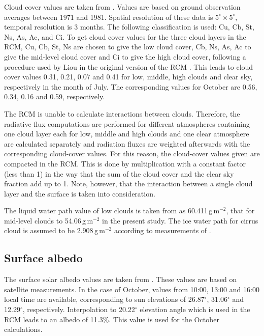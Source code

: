 \documentclass[agp]{svjour}
\begin{document}
\begin{appendix}
Cloud cover values are taken from \citet{Wa88}. Values are based on
ground observation averages between 1971 and 1981. Spatial resolution of
these data is $5^{\circ} \times 5^{\circ}$, temporal resolution is 3
months. The following classification is used: Cu, Cb, St, Ns, As, Ac,
and Ci. To get cloud cover values for the three cloud layers in the RCM,
Cu, Cb, St, Ns are chosen to give the low cloud cover, Cb, Ns, As, Ac to
give the mid-level cloud cover and Ci to give the high cloud cover,
following a procedure used by Liou in the original version of the RCM
\citep{Li85}. This leads to cloud cover values 0.31, 0.21, 0.07 and 0.41
for low, middle, high clouds and clear sky, respectively in the month of
July. The corresponding values for October are 0.56, 0.34, 0.16 and
0.59, respectively.

The RCM is unable to calculate interactions between clouds. Therefore,
the radiative flux computations are performed for different atmospheres
containing one cloud layer each for low, middle and high clouds and one
clear atmosphere are calculated separately and radiation fluxes are
weighted afterwards with the corresponding cloud-cover values. For this
reason, the cloud-cover values given are compacted in the RCM. This is
done by multiplication with a constant factor (less than 1) in the way
that the sum of the cloud cover and the clear sky fraction add up to 1.
Note, however, that the interaction between a single cloud layer and the
surface is taken into consideration.

The liquid water path value of low clouds is taken from \citet{Li83} as
60.411\,g\,m$^{-2}$, that for mid-level clouds to 54.06\,g\,m$^{-2}$ in
the present study. The ice water path for cirrus cloud is assumed to be
2.908\,g\,m$^{-2}$ according to measurements of \citet{He84}.

\subsection*{Surface albedo}

The surface solar albedo values are taken from \citet{Ko92}. These
values are based on satellite measurements. In the case of October,
values from 10:00, 13:00 and 16:00 local time are available,
corresponding to sun elevations of 26.87$^{\circ}$, 31.06$^{\circ}$ and
12.29$^{\circ}$, respectively. Interpolation to 20.22$^{\circ}$
elevation angle which is used in the RCM leads to an albedo of 11.3\%.
This value is used for the October calculations.


\end{appendix}
\end{document}
